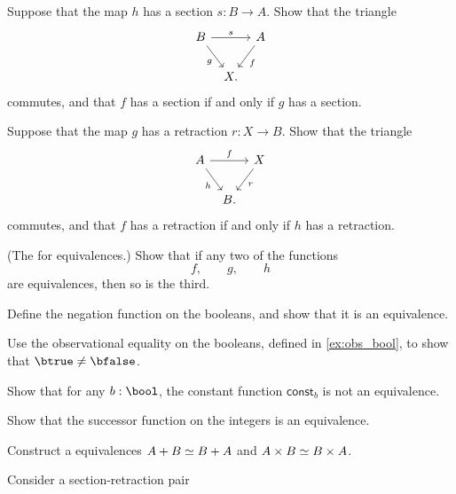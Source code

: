 \begin{exercises}
\begin{subexenum}
\item Suppose that the map $h$ has a section $s:B \to A$. Show that the triangle
\begin{equation*}
\begin{tikzcd}[column sep=tiny]
B \arrow[rr,"s"] \arrow[dr,swap,"g"] & & A \arrow[dl,"f"] \\
& X.
\end{tikzcd}
\end{equation*}
commutes, and that $f$ has a section if and only if $g$ has a section.
\item Suppose that the map $g$ has a retraction $r:X\to B$. Show that the triangle
\begin{equation*}
\begin{tikzcd}[column sep=tiny]
A \arrow[rr,"f"] \arrow[dr,swap,"h"] & & X \arrow[dl,"r"] \\
& B.
\end{tikzcd}
\end{equation*}
commutes, and that $f$ has a retraction if and only if $h$ has a retraction.
\item (The  for equivalences.) Show that if any two of the functions
\begin{equation*}
f,\qquad g,\qquad h
\end{equation*}
are equivalences, then so is the third.
\end{subexenum}
\item \label{ex:neg_equiv} 
\begin{subexenum}
\item Define the negation function on the booleans, and show that it is an equivalence.
\item Use the observational equality on the booleans, defined in \cref{ex:obs_bool}, to show that $\btrue\neq\bfalse$.
\item Show that for any $b:\bool$, the constant function $\mathsf{const}_b$ is not an equivalence.
\end{subexenum}
\item \label{ex:succ_equiv} Show that the successor function on the integers is an equivalence.
\item \label{ex:comm_prod}Construct a equivalences $\eqv{A+B}{B+A}$ and $\eqv{A\times B}{B\times A}$.
\item \label{ex:retr_id} Consider a section-retraction pair
\begin{equation*}

\end{equation*}
\end{exercises}
